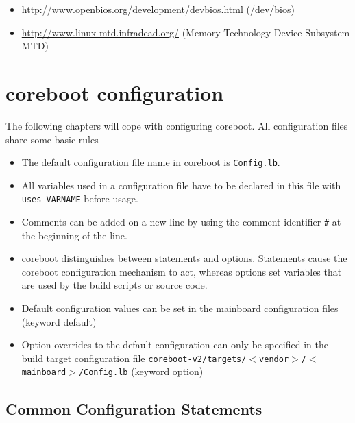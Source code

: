 \documentclass[titlepage,12pt]{article}
\begin{document}
\begin{itemize}
\item \url{http://www.openbios.org/development/devbios.html} (/dev/bios)
\item \url{http://www.linux-mtd.infradead.org/} (Memory Technology Device Subsystem MTD)
\end{itemize}

\newpage

%
%

\section{coreboot configuration}
The following chapters will cope with configuring coreboot. All
configuration files share some basic rules
\begin{itemize}
\item
The default configuration file name in coreboot is \texttt{Config.lb}.
\item 
All variables used in a configuration file have to be declared in this
file with \texttt{uses VARNAME} before usage.
\item
Comments can be added on a new line by using the comment identifier
\texttt{\#} at the beginning of the line.
\item
coreboot distinguishes between statements and options. Statements cause
the coreboot configuration mechanism to act, whereas options set
variables that are used by the build scripts or source code.
\item 
Default configuration values can be set in the mainboard configuration
files (keyword default)
\item 
Option overrides to the default configuration can only be specified in
the build target configuration file
\texttt{coreboot-v2/targets/$<$vendor$>$/$<$mainboard$>$/Config.lb} 
(keyword option)
\end{itemize}

\subsection{Common Configuration Statements}
\end{document}
